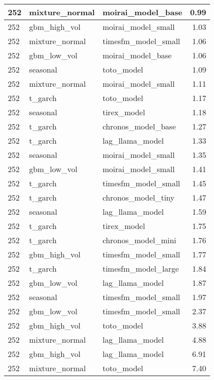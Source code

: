 {\begin{tabular}{lllr}
\midrule
252 & mixture\_normal & moirai\_model\_base & 0.99 \\
\midrule
252 & gbm\_high\_vol & moirai\_model\_small & 1.03 \\
\midrule
252 & mixture\_normal & timesfm\_model\_small & 1.06 \\
\midrule
252 & gbm\_low\_vol & moirai\_model\_base & 1.06 \\
\midrule
252 & seasonal & toto\_model & 1.09 \\
\midrule
252 & mixture\_normal & moirai\_model\_small & 1.11 \\
\midrule
252 & t\_garch & toto\_model & 1.17 \\
\midrule
252 & seasonal & tirex\_model & 1.18 \\
\midrule
252 & t\_garch & chronos\_model\_base & 1.27 \\
\midrule
252 & t\_garch & lag\_llama\_model & 1.33 \\
\midrule
252 & seasonal & moirai\_model\_small & 1.35 \\
\midrule
252 & gbm\_low\_vol & moirai\_model\_small & 1.41 \\
\midrule
252 & t\_garch & timesfm\_model\_small & 1.45 \\
\midrule
252 & t\_garch & chronos\_model\_tiny & 1.47 \\
\midrule
252 & seasonal & lag\_llama\_model & 1.59 \\
\midrule
252 & t\_garch & tirex\_model & 1.75 \\
\midrule
252 & t\_garch & chronos\_model\_mini & 1.76 \\
\midrule
252 & gbm\_high\_vol & timesfm\_model\_small & 1.77 \\
\midrule
252 & t\_garch & timesfm\_model\_large & 1.84 \\
\midrule
252 & gbm\_low\_vol & lag\_llama\_model & 1.87 \\
\midrule
252 & seasonal & timesfm\_model\_small & 1.97 \\
\midrule
252 & gbm\_low\_vol & timesfm\_model\_small & 2.37 \\
\midrule
252 & gbm\_high\_vol & toto\_model & 3.88 \\
\midrule
252 & mixture\_normal & lag\_llama\_model & 4.88 \\
\midrule
252 & gbm\_high\_vol & lag\_llama\_model & 6.91 \\
\midrule
252 & mixture\_normal & toto\_model & 7.40 \\
\bottomrule
\end{tabular}
}